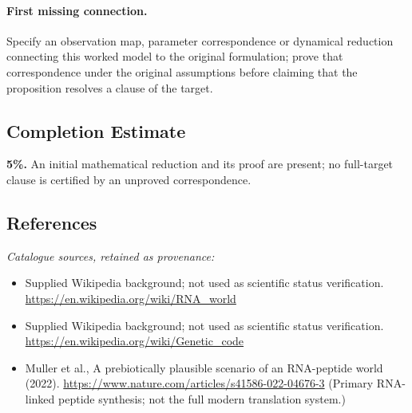 \documentclass[11pt]{article}
\begin{document}
\paragraph{First missing connection.} Specify an observation map, parameter correspondence or dynamical reduction connecting this worked model to the original formulation; prove that correspondence under the original assumptions before claiming that the proposition resolves a clause of the target.
\subsection{Completion Estimate}
\textbf{5\%.} An initial mathematical reduction and its proof are present; no full-target clause is certified by an unproved correspondence.
\subsection{References}
\noindent\emph{Catalogue sources, retained as provenance:}
\begin{itemize}
\item Supplied Wikipedia background; not used as scientific status verification. \url{https://en.wikipedia.org/wiki/RNA_world}
\item Supplied Wikipedia background; not used as scientific status verification. \url{https://en.wikipedia.org/wiki/Genetic_code}
\item Muller et al., A prebiotically plausible scenario of an RNA-peptide world (2022). \url{https://www.nature.com/articles/s41586-022-04676-3} (Primary RNA-linked peptide synthesis; not the full modern translation system.)
\end{itemize}
\clearpage


\appendix
\end{document}
